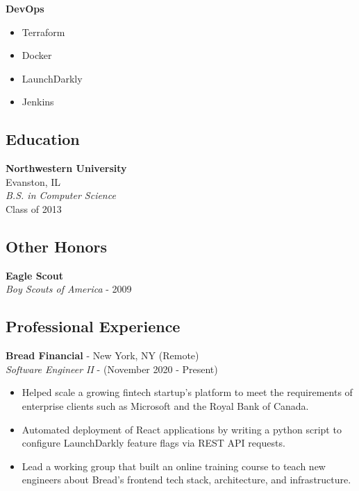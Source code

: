\documentclass[10pt]{article}
\begin{document}
\begin{paracol}{2}
    \noindent \textbf{DevOps}
    \begin{itemize}
        \item Terraform
        \item Docker
        \item LaunchDarkly
        \item Jenkins
    \end{itemize}

    \subsection*{Education}
    \textbf{Northwestern University} \\
    Evanston, IL \\
    \textit{B.S. in Computer Science}  \\
    {\footnotesize{Class of 2013}}

    \subsection*{Other Honors}
    \textbf{Eagle Scout} \\
    \textit{Boy Scouts of America} - {\footnotesize{2009}}

    \switchcolumn

    \subsection*{Professional Experience}

    \textbf{Bread Financial} - New York, NY (Remote) \\
    \textit{Software Engineer II} - {\footnotesize{(November 2020 - Present)}}
    \begin{itemize}
        \item Helped scale a growing fintech startup's platform to meet the requirements of enterprise clients such as Microsoft and the Royal Bank of Canada.
        \item Automated deployment of React applications by writing a python script to configure LaunchDarkly feature flags via REST API requests.
        \item Lead a working group that built an online training course to teach new engineers about Bread's frontend tech stack, architecture, and infrastructure.
    \end{itemize}


\end{paracol}
\end{document}
